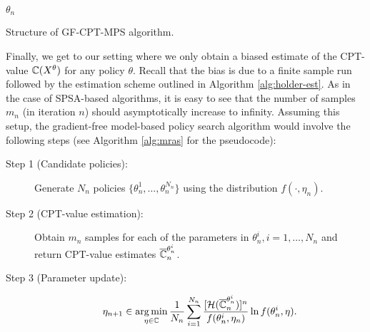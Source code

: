 \documentclass[11pt,letterpaper,english]{article}
\begin{document}
\begin{algorithm}
\begin{algorithmic}
		\EndUpdate
\EndFor
{} $\theta_n$
\end{algorithmic}
\caption{Structure of  GF-CPT-MPS algorithm.}
\label{alg:mras}
\end{algorithm}

                    
Finally, we get to our setting where we only obtain a biased estimate of the CPT-value $\mathbb{C}(X^\theta)$ for any policy $\theta$. Recall that the bias is due to a finite sample run followed by the estimation scheme outlined in Algorithm \ref{alg:holder-est}. As in the case of SPSA-based algorithms, it is easy to see that the number of samples $m_n$ (in iteration $n$) should asymptotically increase to infinity. Assuming this setup, the gradient-free model-based policy search algorithm would involve the following steps (see Algorithm \ref{alg:mras} for the pseudocode):

\begin{description}
 \item[Step 1 (Candidate policies):] Generate $N_n$ policies $\{\theta^1_n, \ldots, \theta^{N_n}_n\}$ using the distribution $f(\cdot,\eta_n)$.

\item[Step 2 (CPT-value estimation):] Obtain $m_n$ samples for each of the parameters in $\theta^i_n, i=1,\ldots, N_n$ and return CPT-value estimates $\overline {\mathbb{C}}_n^{\theta^i_n}$.

\item[Step 3 (Parameter update):]
                         \begin{equation} \label{eqn:step4}
                           \eta_{n+1} \in \mathop{\rm arg\,min}_{\eta \in \mathbb{C}}\frac{1}{N_n}\sum_{i=1}^{N_n}\frac{[\mathcal{H}( \overline {\mathbb{C}}_n^{\theta^i_n})]^n}{ f(\theta_n^i,\eta_n)}\ln f(\theta_n^i,\eta).
                            \end{equation}

\end{description}
\end{document}
